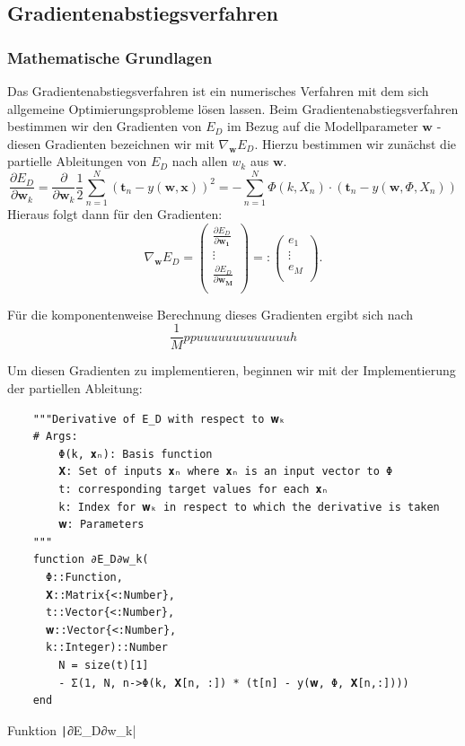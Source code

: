 \documentclass{article}
\theoremstyle{plain} %
\theoremstyle{definition} %
\begin{document}
\subsection{Gradientenabstiegsverfahren}

\subsubsection{Mathematische Grundlagen}

Das Gradientenabstiegsverfahren ist ein numerisches Verfahren mit dem sich allgemeine Optimierungsprobleme lösen lassen. Beim Gradientenabstiegsverfahren bestimmen wir den Gradienten von $E_D$ im Bezug auf die Modellparameter $\mathbf{w}$ - diesen Gradienten bezeichnen wir mit $\nabla_\mathbf{w} E_D$. Hierzu bestimmen wir zunächst die partielle Ableitungen von $E_D$ nach allen $w_k$ aus $\mathbf{w}$.
$$
  \frac{\partial E_D}{\partial \mathbf{w}_k} = \frac{\partial}{\partial \mathbf{w}_k} \frac{1}{2}\sum_{n=1}^{N}(\mathbf{t}_n - y(\mathbf{w}, \mathbf{x}))^2 = - \sum_{n=1}^N \Phi(k, X_n) \cdot (\mathbf{t}_n - y(\mathbf{w}, \Phi, X_n))
$$
Hieraus folgt dann für den Gradienten:
$$
  \nabla_\mathbf{w} E_D
    = \left( \begin{array}{c}
      \frac{\partial E_D}{\partial \mathbf{w_1}}\\
      \vdots\\
      \frac{\partial E_D}{\partial \mathbf{w_M}}\\
      \end{array} \right)
    =: \left( \begin{array}{c}
      e_1\\
      \vdots\\
      e_M\\
      \end{array} \right).
$$

Für die komponentenweise Berechnung dieses Gradienten ergibt sich nach \cite[S. 95f]{Lippe}
$$
  \frac{1}{M}ppuuuuuuuuuuuuuh
$$

Um diesen Gradienten zu implementieren, beginnen wir mit der Implementierung der partiellen Ableitung:

\begin{listing}[H]
  \begin{verbatim} 
    """Derivative of E_D with respect to 𝐰ₖ
    # Args:
        Φ(k, 𝐱ₙ): Basis function
        𝐗: Set of inputs 𝐱ₙ where 𝐱ₙ is an input vector to Φ
        t: corresponding target values for each 𝐱ₙ
        k: Index for 𝐰ₖ in respect to which the derivative is taken
        𝐰: Parameters
    """
    function ∂E_D∂w_k(
      Φ::Function,
      𝐗::Matrix{<:Number},
      t::Vector{<:Number},
      𝐰::Vector{<:Number},
      k::Integer)::Number
        N = size(t)[1]
        - Σ(1, N, n->Φ(k, 𝐗[n, :]) * (t[n] - y(𝐰, Φ, 𝐗[n,:])))
    end
  \end{verbatim}
  \caption{Funktion \texttt|∂E_D∂w_k|}
  \label{listing:partial}
\end{listing}
\end{document}
